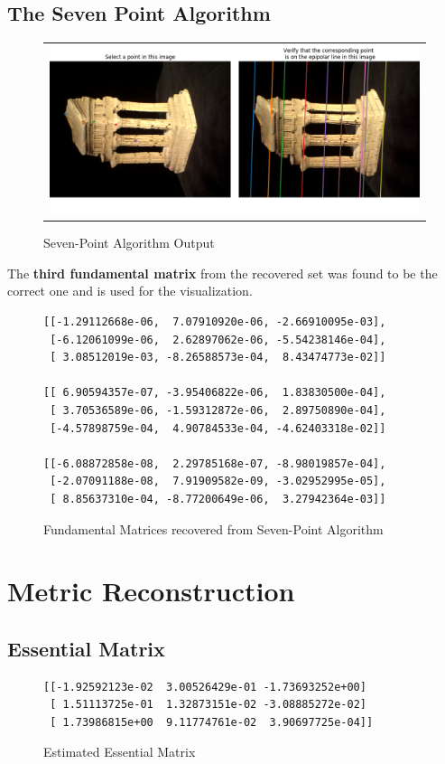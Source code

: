 \documentclass[a4paper]{article}
\begin{document}
\subsection{The Seven Point Algorithm}
\begin{figure}[!ht]
\centering
\begin{tabular}{c}
{\includegraphics[width=\textwidth]{images/sevenpoint.png}}
\end{tabular}
\caption{Seven-Point Algorithm Output}
\end{figure}

The \textbf{third fundamental matrix} from the recovered set was found to be the correct one and is used for the visualization.

\begin{figure}[!ht]
\centering
\begin{BVerbatim}
[[-1.29112668e-06,  7.07910920e-06, -2.66910095e-03],
 [-6.12061099e-06,  2.62897062e-06, -5.54238146e-04],
 [ 3.08512019e-03, -8.26588573e-04,  8.43474773e-02]]

[[ 6.90594357e-07, -3.95406822e-06,  1.83830500e-04],
 [ 3.70536589e-06, -1.59312872e-06,  2.89750890e-04],
 [-4.57898759e-04,  4.90784533e-04, -4.62403318e-02]]

[[-6.08872858e-08,  2.29785168e-07, -8.98019857e-04],
 [-2.07091188e-08,  7.91909582e-09, -3.02952995e-05],
 [ 8.85637310e-04, -8.77200649e-06,  3.27942364e-03]]
\end{BVerbatim}
\caption{Fundamental Matrices recovered from Seven-Point Algorithm}
\end{figure}

\section{Metric Reconstruction}
\subsection{Essential Matrix}
\begin{figure}[!ht]
\centering
\begin{BVerbatim}
[[-1.92592123e-02  3.00526429e-01 -1.73693252e+00]
 [ 1.51113725e-01  1.32873151e-02 -3.08885272e-02]
 [ 1.73986815e+00  9.11774761e-02  3.90697725e-04]]
\end{BVerbatim}
\caption{Estimated Essential Matrix}
\end{figure}
\end{document}
